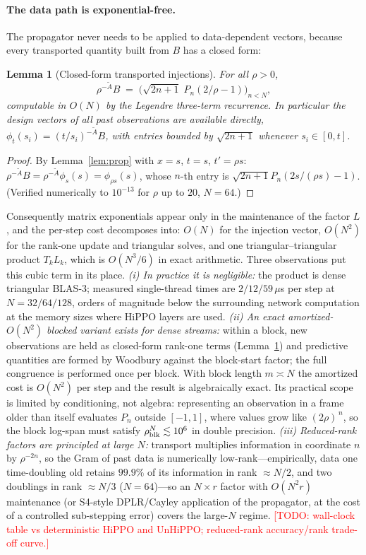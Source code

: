 \documentclass[11pt]{article}
\newtheorem{lemma}{Lemma}
\newcommand{\At}{\widetilde{A}}
\newcommand{\TODO}[1]{\textcolor{red}{[TODO: #1]}}
\begin{document}
\paragraph{The data path is exponential-free.} The propagator never needs to be applied to data-dependent vectors, because every transported quantity built from $B$ has a closed form:

\begin{lemma}[Closed-form transported injections]\label{lem:closedform}
For all $\rho>0$,
\begin{equation}
    \rho^{-\At}B \;=\; \big(\sqrt{2n+1}\;P_n(2/\rho-1)\big)_{n<N},
\end{equation}
computable in $O(N)$ by the Legendre three-term recurrence. In particular the design vectors of all past observations are available directly, $\phi_t(s_i)=(t/s_i)^{-\At}B$, with entries bounded by $\sqrt{2n+1}$ whenever $s_i\in[0,t]$.
\end{lemma}
\begin{proof}
By Lemma~\ref{lem:prop} with $x=s$, $t=s$, $t'=\rho s$: $\rho^{-\At}B=\rho^{-\At}\phi_s(s)=\phi_{\rho s}(s)$, whose $n$-th entry is $\sqrt{2n+1}P_n(2s/(\rho s)-1)$. (Verified numerically to $10^{-13}$ for $\rho$ up to $20$, $N=64$.)
\end{proof}

Consequently matrix exponentials appear only in the maintenance of the factor $L$, and the per-step cost decomposes into: $O(N)$ for the injection vector, $O(N^2)$ for the rank-one update and triangular solves, and one triangular--triangular product $T_kL_k$, which is $O(N^3/6)$ in exact arithmetic. Three observations put this cubic term in its place. \emph{(i) In practice it is negligible:} the product is dense triangular BLAS-3; measured single-thread times are $2/12/59\,\mu$s per step at $N=32/64/128$, orders of magnitude below the surrounding network computation at the memory sizes where HiPPO layers are used. \emph{(ii) An exact amortized-$O(N^2)$ blocked variant exists for dense streams:} within a block, new observations are held as closed-form rank-one terms (Lemma~\ref{lem:closedform}) and predictive quantities are formed by Woodbury against the block-start factor; the full congruence is performed once per block. With block length $m\asymp N$ the amortized cost is $O(N^2)$ per step and the result is algebraically exact. Its practical scope is limited by conditioning, not algebra: representing an observation in a frame older than itself evaluates $P_n$ outside $[-1,1]$, where values grow like $(2\rho)^{\,n}$, so the block log-span must satisfy $\rho_{\rm blk}^{N}\lesssim10^{6}$ in double precision. \emph{(iii) Reduced-rank factors are principled at large $N$:} transport multiplies information in coordinate $n$ by $\rho^{-2n}$, so the Gram of past data is numerically low-rank---empirically, data one time-doubling old retains $99.9\%$ of its information in rank $\approx N/2$, and two doublings in rank $\approx N/3$ ($N=64$)---so an $N\times r$ factor with $O(N^2 r)$ maintenance (or S4-style DPLR/Cayley application of the propagator, at the cost of a controlled sub-stepping error) covers the large-$N$ regime. \TODO{wall-clock table vs deterministic HiPPO and UnHiPPO; reduced-rank accuracy/rank trade-off curve.}
\end{document}
